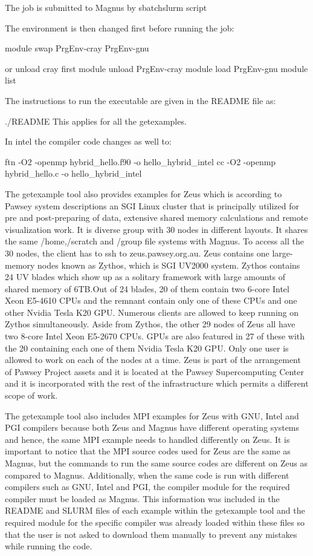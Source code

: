\begin{Document}
The job is submitted to Magnus by sbatch{slurm script}

The environment is then changed first before running the job:

module swap PrgEnv-cray PrgEnv-gnu

or unload cray first
module unload PrgEnv-cray
module load PrgEnv-gnu
module list

The instructions to run the executable are given in the README  file as:

./README 
This applies for all the getexamples.

In intel the compiler code changes as well to:

ftn -O2 -openmp hybrid_hello.f90 -o hello_hybrid_intel
cc -O2 -openmp hybrid_hello.c -o hello_hybrid_intel



The getexample tool also provides examples for Zeus which is according to Pawsey system descriptions an SGI Linux cluster that is principally utilized 
for pre and post-preparing of data, extensive shared memory calculations and remote visualization work. It is diverse group with 30 nodes in different layouts. It shares the same /home,/scratch and 
/group file systems with Magnus. To access all the 30 nodes, the client has to ssh to zeus.pawsey.org.au.
Zeus contains one large-memory nodes known as Zythos, which is SGI UV2000 system. Zythos contains 24 UV blades which show up as a solitary framework 
with large amounts of shared memory of 6TB.Out of 24 blades, 20 of them contain two 6-core Intel Xeon E5-4610 CPUs and the remnant contain only one of 
these CPUs and one other Nvidia Tesla K20 GPU. Numerous clients are allowed to keep running on Zythos simultaneously. Aside from Zythos, the other 29 
nodes of Zeus all have two 8-core Intel Xeon E5-2670 CPUs. GPUs are also featured in 27 of these with the 20 containing each one of them Nvidia Tesla 
K20 GPU. Only one user is allowed to work on each of the nodes at a time. Zeus is part of the arrangement of Pawsey Project assets and it is located at 
the Pawsey Supercomputing Center and it is incorporated with the rest of the infrastructure which permits a different scope of work.
 



The getexample tool also includes MPI examples for Zeus with GNU, Intel and PGI compilers because both Zeus and Magnus have different operating systems 
and hence, the same MPI example needs to handled differently on Zeus. It is important to notice that the MPI source codes used for Zeus are the same
as Magnus, but the commands to run the same source codes are different on Zeus as compared to Magnus. Additionally, when the same code is run 
with different compilers such as GNU, Intel and PGI, the compiler module for the required compiler must be loaded as Magnus. This information was
included in the README and SLURM files of each example within the getexample tool and the required module for the specific compiler was already loaded 
within these files so that the user is not asked to download them manually to prevent any mistakes while running the code.


\end{Document}
